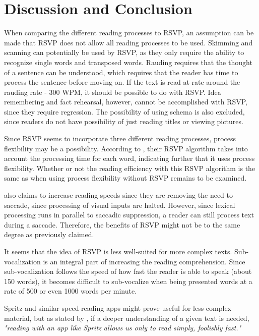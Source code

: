 \section{Discussion and Conclusion}
When comparing the different reading processes to RSVP, an assumption can be made that RSVP does not allow all reading processes to be used. Skimming and scanning can potentially be used by RSVP, as they only require the ability to recognize single words and transposed words. Rauding requires that the thought of a sentence can be understood, which requires that the reader has time to process the sentence before moving on. If the text is read at rate around the rauding rate - 300 WPM, it should be possible to do with RSVP.   Idea remembering and fact rehearsal, however, cannot be accomplished with RSVP, since they require regression. The possibility of using schema is also excluded, since readers do not have possibility of just reading titles or viewing pictures.

Since RSVP seems to incorporate three different reading processes, process flexibility may be a possibility. According to \cite{spritz}, their RSVP algorithm takes into account the processing time for each word, indicating further that it uses process flexibility. Whether or not the reading efficiency with this RSVP algorithm is the same as when using process flexibility without RSVP remains to be examined.

 also claims to increase reading speeds since they are removing the need to saccade, since processing of visual inputs are halted. However, since lexical processing runs in parallel 
to saccadic suppression, a reader can still process text during a saccade. Therefore, the benefits of RSVP might not be to the same degree as previously claimed.

It seems that the idea of RSVP is less well-suited for more complex texts. Sub-vocalization is an integral part of increasing the reading comprehension. Since sub-vocalization follows the speed of how fast the reader is able to speak (about 150 words), it becomes difficult to sub-vocalize when being presented words at a rate of 500 or even 1000 words per minute. 

Spritz and similar speed-reading apps might prove useful for less-complex material, but as stated by , if a deeper understanding of a given text is needed, \emph{"reading with an app like Spritz allows us only to read simply, foolishly fast."}

